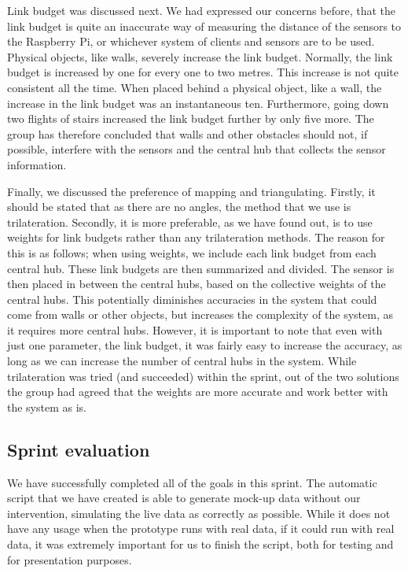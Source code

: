 \documentclass[../document]{subfiles}
\begin{document}
Link budget was discussed next. We had expressed our concerns before, that the link budget is quite an inaccurate way of measuring the distance of the sensors to the Raspberry Pi, or whichever system of clients and sensors are to be used. Physical objects, like walls, severely increase the link budget. Normally, the link budget is increased by one for every one to two metres. This increase is not quite consistent all the time. When placed behind a physical object, like a wall, the increase in the link budget was an instantaneous ten. Furthermore, going down two flights of stairs increased the link budget further by only five more. The group has therefore concluded that walls and other obstacles should not, if possible, interfere with the sensors and the central hub that collects the sensor information.

Finally, we discussed the preference of mapping and triangulating. Firstly, it should be stated that as there are no angles, the method that we use is trilateration. Secondly, it is more preferable, as we have found out, is to use weights for link budgets rather than any trilateration methods. The reason for this is as follows; when using weights, we include each link budget from each central hub. These link budgets are then summarized and divided. The sensor is then placed in between the central hubs, based on the collective weights of the central hubs. This potentially diminishes accuracies in the system that could come from walls or other objects, but increases the complexity of the system, as it requires more central hubs. However, it is important to note that even with just one parameter, the link budget, it was fairly easy to increase the accuracy, as long as we can increase the number of central hubs in the system. While trilateration was tried (and succeeded) within the sprint, out of the two solutions the group had agreed that the weights are more accurate and work better with the system as is.

\subsection{Sprint evaluation}

We have successfully completed all of the goals in this sprint. The automatic script that we have created is able to generate mock-up data without our intervention, simulating the live data as correctly as possible. While it does not have any usage when the prototype runs with real data, if it could run with real data, it was extremely important for us to finish the script, both for testing and for presentation purposes.
\end{document}
